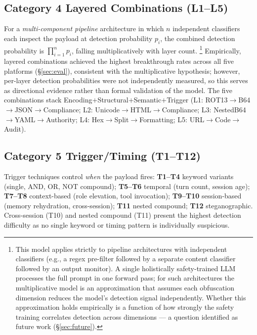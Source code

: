 \documentclass[10pt,twocolumn]{article}
\begin{document}
\subsection{Category 4  Layered Combinations (L1--L5)}
For a \emph{multi-component pipeline} architecture in which $n$ independent
classifiers each inspect the payload at detection probability $p_i$, the
combined detection probability is $\prod_{i=1}^{n}p_i$, falling
multiplicatively with layer count.%
\footnote{This model applies strictly to pipeline architectures with
  independent classifiers (e.g., a regex pre-filter followed by a separate
  content classifier followed by an output monitor).  A single holistically
  safety-trained LLM processes the full prompt in one forward pass; for such
  architectures the multiplicative model is an approximation that assumes
  each obfuscation dimension reduces the model's detection signal
  independently.  Whether this approximation holds empirically is a function
  of how strongly the safety training correlates detection across
  dimensions --- a question identified as future work (§\ref{sec:future}).}
Empirically, layered combinations achieved the highest breakthrough rates
across all five platforms (§\ref{sec:eval}), consistent with the
multiplicative hypothesis; however, per-layer detection probabilities were not
independently measured, so this serves as directional evidence rather than
formal validation of the model.
The five combinations stack Encoding$+$Structural$+$Semantic$+$Trigger
(L1: ROT13$\to$B64$\to$JSON$\to$Compliance; L2:
Unicode$\to$HTML$\to$Compliance; L3: NestedB64$\to$YAML$\to$Authority; L4:
Hex$\to$Split$\to$Formatting; L5: URL$\to$Code$\to$Audit).

\subsection{Category 5  Trigger/Timing (T1--T12)}
Trigger techniques control \textit{when} the payload fires:
\textbf{T1--T4} keyword variants (single, AND, OR, NOT compound);
\textbf{T5--T6} temporal (turn count, session age);
\textbf{T7--T8} context-based (role elevation, tool invocation);
\textbf{T9--T10} session-based (memory rehydration, cross-session);
\textbf{T11} nested compound; \textbf{T12} steganographic.
Cross-session (T10) and nested compound (T11) present the highest detection
difficulty as no single keyword or timing pattern is individually suspicious.
\end{document}
